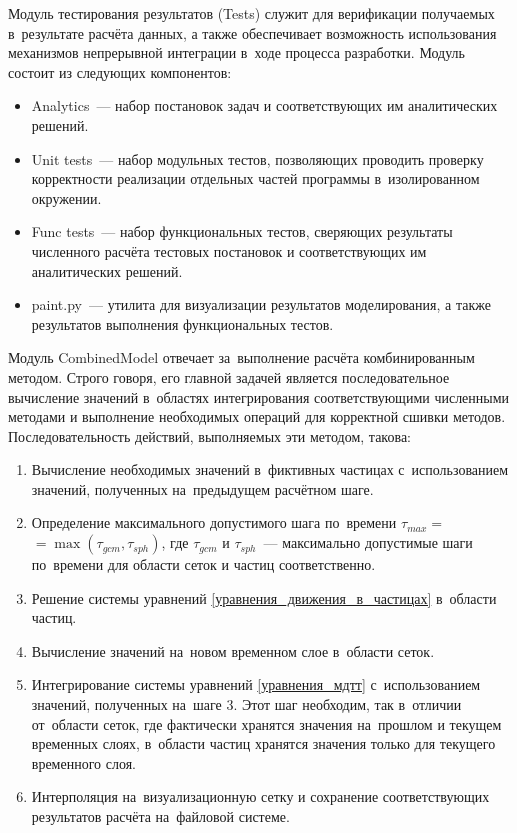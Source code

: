 \documentclass[thesis.tex]{subfiles}
\begin{document}
Модуль тестирования результатов (Tests) служит для верификации получаемых в~результате расчёта данных, а также
обеспечивает возможность использования механизмов непрерывной интеграции в~ходе процесса разработки. Модуль состоит из
следующих компонентов:
\begin{itemize}
    \item Analytics~--- набор постановок задач и соответствующих им аналитических решений.
    \item Unit tests~---  набор модульных тестов, позволяющих проводить проверку корректности реализации
    отдельных частей программы в~изолированном окружении.
    \item Func tests~--- набор функциональных тестов, сверяющих результаты численного расчёта тестовых постановок
    и соответствующих им аналитических решений.
    \item paint.py~--- утилита для визуализации результатов моделирования, а также результатов выполнения
    функциональных тестов.
\end{itemize}

Модуль CombinedModel отвечает за~выполнение расчёта комбинированным методом. Строго говоря, его главной задачей является
последовательное вычисление значений в~областях интегрирования соответствующими численными методами и выполнение
необходимых операций для корректной сшивки методов. Последовательность действий, выполняемых эти методом, такова:
\begin{enumerate}
    \item Вычисление необходимых значений в~фиктивных частицах с~использованием значений, полученных на~предыдущем
    расчётном шаге.
    \item Определение максимального допустимого шага по~времени $\tau_{max}=$ \\
          $=\max (\tau_{gcm}, \tau_{sph})$, где
    $\tau_{gcm}$ и $\tau_{sph}$~--- максимально допустимые шаги по~времени для области сеток и частиц соответственно.
    \item Решение системы уравнений \eqref{уравнения_движения_в_частицах} в~области частиц.
    \item Вычисление значений на~новом временном слое в~области сеток.
    \item Интегрирование системы уравнений \eqref{уравнения_мдтт} с~использованием значений, полученных на~шаге 3. Этот
    шаг необходим, так в~отличии от~области сеток, где фактически хранятся значения на~прошлом и текущем временных слоях,
    в~области частиц хранятся значения только для текущего временного слоя.
    \item Интерполяция на~визуализационную сетку и сохранение соответствующих результатов расчёта на~файловой системе.
\end{enumerate}
\end{document}
